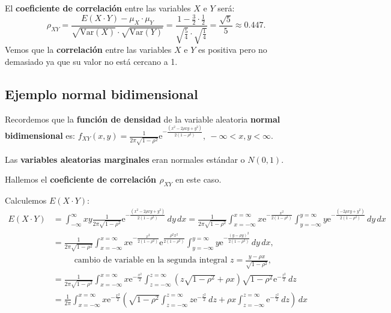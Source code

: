 \documentclass[]{book}
\begin{document}
El \textbf{coeficiente de correlación} entre las variables \(X\) e \(Y\) será:
\[
\rho_{XY}=\frac{E(X\cdot Y)-\mu_X\cdot \mu_Y}{\sqrt{\mathrm{Var}(X)}\cdot\sqrt{\mathrm{Var}(Y)}}=\frac{1-\frac{3}{2}\cdot \frac{1}{2}}{\sqrt{\frac{5}{4}}\cdot\sqrt{\frac{1}{4}}}=\frac{\sqrt{5}}{5}\approx 0.447.
\]
Vemos que la \textbf{correlación} entre las variables \(X\) e \(Y\) es positiva pero no demasiado ya que su valor no está cercano a 1.

\hypertarget{ejemplo-normal-bidimensional}{%
\subsection{Ejemplo normal bidimensional}\label{ejemplo-normal-bidimensional}}

Recordemos que la \textbf{función de densidad} de la variable aleatoria \textbf{normal bidimensional} es:
\(f_{XY}(x,y)=\frac{1}{2\pi\sqrt{1-\rho^2}}\mathrm{e}^{-\frac{(x^2-2\rho xy+y^2)}{2(1-\rho^2)}},\ -\infty <x,y<\infty.\)

Las \textbf{variables aleatorias marginales} eran normales estándar o \(N(0,1)\).

Hallemos el \textbf{coeficiente de correlación \(\rho_{XY}\)} en este caso.

Calculemos \(E(X\cdot Y)\):
\[
\begin{array}{rl}
E(X\cdot Y) & = \int_{-\infty}^\infty x y \frac{1}{2\pi\sqrt{1-\rho^2}}\mathrm{e}^{-\frac{(x^2-2\rho xy+y^2)}{2(1-\rho^2)}}\, dy\, dx = \frac{1}{2\pi\sqrt{1-\rho^2}}\int_{x=-\infty}^{x=\infty}x  \mathrm{e}^{-\frac{x^2}{2(1-\rho^2)}}\int_{y=-\infty}^{y=\infty}y \mathrm{e}^{-\frac{(-2\rho xy+y^2)}{2(1-\rho^2)}}\, dy\, dx \\ & = \frac{1}{2\pi\sqrt{1-\rho^2}}\int_{x=-\infty}^{x=\infty}x  \mathrm{e}^{-\frac{x^2}{2(1-\rho^2)}}  \mathrm{e}^{\frac{\rho^2 x^2}{2(1-\rho^2)}} \int_{y=-\infty}^{y=\infty}y \mathrm{e}^{-\frac{(y-\rho y)^2}{2(1-\rho^2)}}\, dy\, dx,\\ &\ \qquad\mbox{ cambio de variable en la segunda integral $z=\frac{y-\rho x}{\sqrt{1-\rho^2}}$,}\\ & = \frac{1}{2\pi\sqrt{1-\rho^2}}\int_{x=-\infty}^{x=\infty}x  \mathrm{e}^{-\frac{x^2}{2}}  \int_{z=-\infty}^{z=\infty} \left(z\sqrt{1-\rho^2}+\rho x\right)\sqrt{1-\rho^2}\mathrm{e}^{-\frac{z^2}{2}}\, dz\, \\ & =
\frac{1}{2\pi} \int_{x=-\infty}^{x=\infty}x  \mathrm{e}^{-\frac{x^2}{2}} \left(\sqrt{1-\rho^2}\int_{z=-\infty}^{z=\infty} z \mathrm{e}^{-\frac{z^2}{2}}\, dz +\rho x \int_{z=-\infty}^{z=\infty}\mathrm{e}^{-\frac{z^2}{2}}\, dz \right)\, dx
\end{array}
\]
\end{document}
